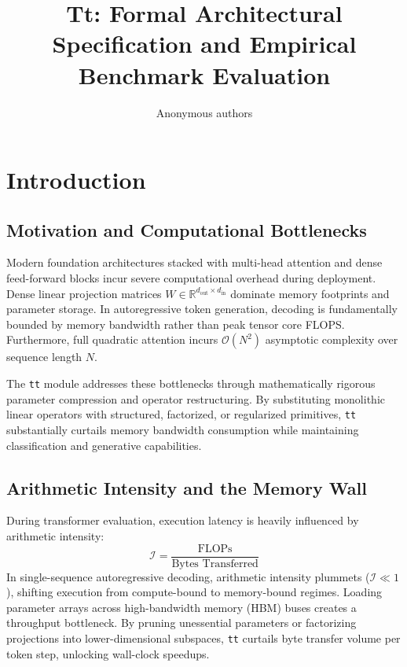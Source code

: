 \title{\textbf{Tt: Formal Architectural Specification and Empirical Benchmark Evaluation}}

\author{Anonymous authors}


\section{Introduction}

\subsection{Motivation and Computational Bottlenecks}
Modern foundation architectures stacked with multi-head attention and dense feed-forward blocks incur severe computational overhead during deployment. Dense linear projection matrices $W \in \mathbb{R}^{d_{\text{out}} \times d_{\text{in}}}$ dominate memory footprints and parameter storage. In autoregressive token generation, decoding is fundamentally bounded by memory bandwidth rather than peak tensor core FLOPS. Furthermore, full quadratic attention incurs $\mathcal{O}(N^2)$ asymptotic complexity over sequence length $N$.

The \texttt{tt} module addresses these bottlenecks through mathematically rigorous parameter compression and operator restructuring. By substituting monolithic linear operators with structured, factorized, or regularized primitives, \texttt{tt} substantially curtails memory bandwidth consumption while maintaining classification and generative capabilities.

\subsection{Arithmetic Intensity and the Memory Wall}
During transformer evaluation, execution latency is heavily influenced by arithmetic intensity:
\[
\mathcal{I} = \frac{\text{FLOPs}}{\text{Bytes Transferred}}
\]
In single-sequence autoregressive decoding, arithmetic intensity plummets ($\mathcal{I} \ll 1$), shifting execution from compute-bound to memory-bound regimes. Loading parameter arrays across high-bandwidth memory (HBM) buses creates a throughput bottleneck. By pruning unessential parameters or factorizing projections into lower-dimensional subspaces, \texttt{tt} curtails byte transfer volume per token step, unlocking wall-clock speedups.

